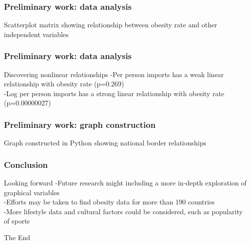 \documentclass{beamer}
\begin{document}
\begin{frame}
\frametitle{Preliminary work: data analysis}
Scatterplot matrix showing relationship between obesity rate and other independent variables
\end{frame}

\begin{frame}
\frametitle{Preliminary work: data analysis}
\begin{block}
{Discovering nonlinear relationships}
-Per person imports has a weak linear relationship with obesity rate (p=0.269)
\\
-Log per person imports has a strong linear relationship with obesity rate (p=0.00000027)
\end{block}
\end{frame}

\begin{frame}
\frametitle{Preliminary work: graph construction}
Graph constructed in Python showing national border relationships
\end{frame}

\begin{frame}
\frametitle{Conclusion}
\begin{block}
{Looking forward}
-Future research might including a more in-depth exploration of graphical variables
\\
-Efforts may be taken to find obesity data for more than 190 countries
\\
-More lifestyle data and cultural factors could be considered, such as popularity of sports
\end{block}
\end{frame}
 
\begin{frame}
\centerline{The End}
\end{frame}
\end{document}

